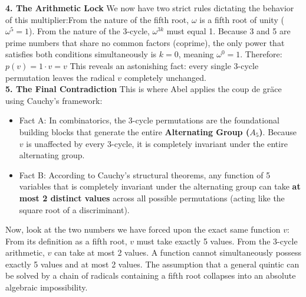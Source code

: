 {\bf 4. The Arithmetic Lock}
We now have two strict rules dictating the behavior of this multiplier:From the nature of the fifth root, \(\omega \) is a fifth root of unity (\(\omega^5 = 1\)).
From the nature of the 3-cycle, \(\omega ^{3k}\) must equal 1.
Because 3 and 5 are prime numbers that share no common factors (coprime), the only power that satisfies both conditions simultaneously is \(k = 0\), meaning \(\omega^0 = 1\).
Therefore:\(p(v)=1\cdot v=v\)
This reveals an astonishing fact: every single 3-cycle permutation leaves the radical \(v\) completely unchanged.\\ 

{\bf 5. The Final Contradiction}
This is where Abel applies the coup de gr\"ace using Cauchy's framework:\\
\begin{itemize}
\item[]Fact A: In combinatorics, the 3-cycle permutations are the foundational building blocks that generate the entire {\bf Alternating Group (\(A_{5}\))}. 
Because \(v\) is unaffected by every 3-cycle, it is completely invariant under the entire alternating group.
\item[]Fact B: According to Cauchy's structural theorems, any function of 5 variables that is completely invariant under the alternating group can take {\bf at most 2 distinct values} across all possible permutations (acting like the square root of a discriminant).
\end{itemize}
Now, look at the two numbers we have forced upon the exact same function \(v\): From its definition as a fifth root, \(v\) must take exactly 5 values.
From the 3-cycle arithmetic, \(v\) can take at most 2 values.
A function cannot simultaneously possess exactly 5 values and at most 2 values. 
The assumption that a general quintic can be solved by a chain of radicals containing a fifth root collapses into an absolute algebraic impossibility.\\
